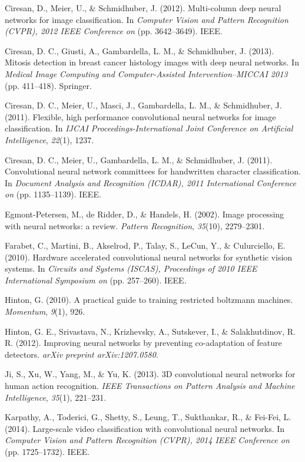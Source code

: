 \documentclass{article}
\begin{document}
\begin{thebibliography}{99}
  Ciresan, D., Meier, U., \& Schmidhuber, J. (2012). Multi-column deep neural networks for image classification. In \textit{Computer Vision and Pattern Recognition (CVPR), 2012 IEEE Conference on} (pp. 3642–3649). IEEE.

  Ciresan, D. C., Giusti, A., Gambardella, L. M., \& Schmidhuber, J. (2013). Mitosis detection in breast cancer histology images with deep neural networks. In \textit{Medical Image Computing and Computer-Assisted Intervention–MICCAI 2013} (pp. 411–418). Springer.

  Ciresan, D. C., Meier, U., Masci, J., Gambardella, L. M., \& Schmidhuber, J. (2011). Flexible, high performance convolutional neural networks for image classification. In \textit{IJCAI Proceedings-International Joint Conference on Artificial Intelligence}, \textit{22}(1), 1237.

  Ciresan, D. C., Meier, U., Gambardella, L. M., \& Schmidhuber, J. (2011). Convolutional neural network committees for handwritten character classification. In \textit{Document Analysis and Recognition (ICDAR), 2011 International Conference on} (pp. 1135–1139). IEEE.

  Egmont-Petersen, M., de Ridder, D., \& Handels, H. (2002). Image processing with neural networks: a review. \textit{Pattern Recognition}, \textit{35}(10), 2279–2301.

  Farabet, C., Martini, B., Akselrod, P., Talay, S., LeCun, Y., \& Culurciello, E. (2010). Hardware accelerated convolutional neural networks for synthetic vision systems. In \textit{Circuits and Systems (ISCAS), Proceedings of 2010 IEEE International Symposium on} (pp. 257–260). IEEE.

  Hinton, G. (2010). A practical guide to training restricted boltzmann machines. \textit{Momentum}, \textit{9}(1), 926.

  Hinton, G. E., Srivastava, N., Krizhevsky, A., Sutskever, I., \& Salakhutdinov, R. R. (2012). Improving neural networks by preventing co-adaptation of feature detectors. \textit{arXiv preprint arXiv:1207.0580}.

  Ji, S., Xu, W., Yang, M., \& Yu, K. (2013). 3D convolutional neural networks for human action recognition. \textit{IEEE Transactions on Pattern Analysis and Machine Intelligence}, \textit{35}(1), 221–231.

 Karpathy, A., Toderici, G., Shetty, S., Leung, T., Sukthankar, R., \& Fei-Fei, L. (2014). Large-scale video classification with convolutional neural networks. In \textit{Computer Vision and Pattern Recognition (CVPR), 2014 IEEE Conference on} (pp. 1725–1732). IEEE.


\end{thebibliography}
\end{document}
